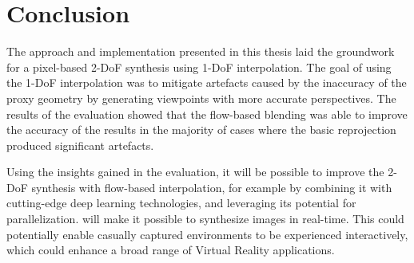 \chapter{Conclusion}

The approach and implementation presented in this thesis laid the groundwork for a pixel-based 2-DoF synthesis using 1-DoF interpolation. 
The goal of using the 1-DoF interpolation was to mitigate artefacts caused by the inaccuracy of the proxy geometry by generating viewpoints with more accurate perspectives.
The results of the evaluation showed that the flow-based blending was able to improve the accuracy of the results in the majority of cases where the basic reprojection produced significant artefacts.

Using the insights gained in the evaluation, it will be possible to improve the 2-DoF synthesis with flow-based interpolation, for example by combining it with cutting-edge deep learning technologies, and leveraging its potential for parallelization. will make it possible to synthesize images in real-time.
This could potentially enable casually captured environments to be experienced interactively, which could enhance a broad range of Virtual Reality applications.




